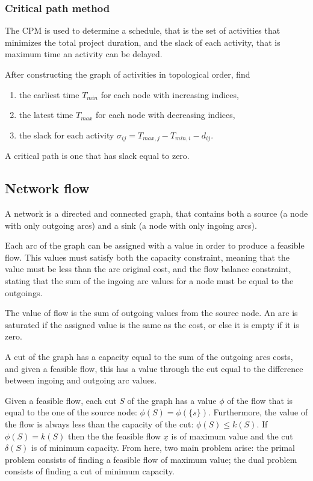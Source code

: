 \subsubsection{Critical path method}

The CPM is used to determine a schedule, that is the set of activities that minimizes the total project duration, and the slack of each activity, that is maximum time an activity can be delayed.

After constructing the graph of activities in topological order, find

\begin{enumerate}
    \item the earliest time $T_{min}$ for each node with increasing indices,
    \item the latest time $T_{max}$ for each node with decreasing indices,
    \item the slack for each activity $\sigma_{ij} = T_{max, j} - T_{min, i} - d_{ij}$.
\end{enumerate}

A critical path is one that has slack equal to zero.

\subsection{Network flow}

A network is a directed and connected graph, that contains both a source (a node with only outgoing arcs) and a sink (a node with only ingoing arcs).

Each arc of the graph can be assigned with a value in order to produce a feasible flow.
This values must satisfy both the capacity constraint, meaning that the value must be less than the arc original cost, and the flow balance constraint, stating that the sum of the ingoing arc values for a node must be equal to the outgoings.

The value of flow is the sum of outgoing values from the source node.
An arc is saturated if the assigned value is the same as the cost, or else it is empty if it is zero.

A cut of the graph has a capacity equal to the sum of the outgoing arcs costs, and given a feasible flow, this has a value through the cut equal to the difference between ingoing and outgoing arc values.

Given a feasible flow, each cut $S$ of the graph has a value $\phi$ of the flow that is equal to the one of the source node: $\phi(S) = \phi(\{s\})$.
Furthermore, the value of the flow is always less than the capacity of the cut: $\phi(S) \le k(S)$.
If $\phi(S) = k(S)$ then the the feasible flow $\underline{x}$ is of maximum value and the cut $\delta(S)$ is of minimum capacity.
From here, two main problem arise: the primal problem consists of finding a feasible flow of maximum value; the dual problem consists of finding a cut of minimum capacity.


